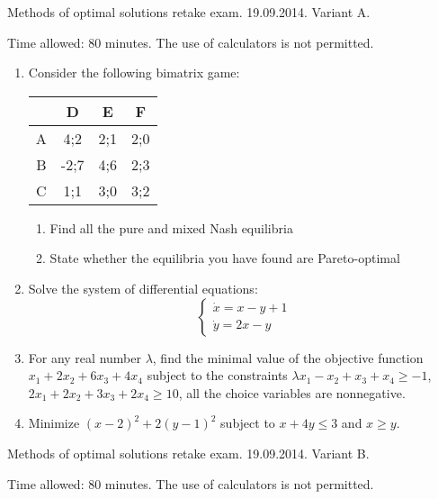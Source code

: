 \documentclass[12pt,a4paper]{article}
\begin{document}
Methods of optimal solutions retake exam. 19.09.2014. Variant A.

Time allowed: 80 minutes. The use of calculators is not permitted.

\begin{enumerate}
\item   Consider the following bimatrix game:


\begin{tabular}{c|ccc}
 & D & E & F \\ 
\hline 
A & 4;2 & 2;1 & 2;0  \\ 
B & -2;7 & 4;6 & 2;3  \\ 
C & 1;1 & 3;0 & 3;2  \\ 
\end{tabular} 

\begin{enumerate}
\item Find all the pure and mixed Nash equilibria
\item State whether the equilibria you have found are Pareto-optimal
\end{enumerate}

\item Solve the system of differential equations:
\[
\begin{cases}
\dot{x}=x-y + 1\\
\dot{y}=2x-y
\end{cases}
\]

\item For any real number $\lambda$, find the minimal value of the objective function $x_1+2x_2+6x_3+4x_4$ subject to the constraints  $\lambda x_1-x_2+x_3+x_4\geq -1$, $2x_1+2x_2+3x_3+2x_4 \geq 10$,  all the choice variables are nonnegative. 


\item Minimize $(x-2)^2+2 (y-1)^2$ subject to $x+4y\leq 3$ and $x\geq y$.




\end{enumerate}

\newpage

Methods of optimal solutions retake exam. 19.09.2014. Variant B.

Time allowed: 80 minutes. The use of calculators is not permitted.
\end{document}
